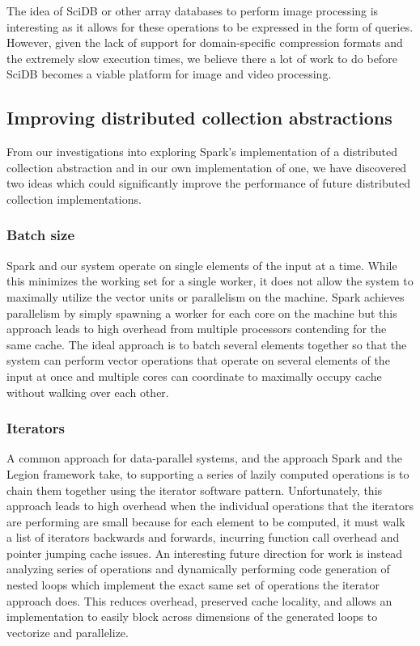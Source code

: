 \documentclass[tog]{acmsiggraph}
\begin{document}
The idea of SciDB or other array databases to perform image processing is
interesting as it allows for these operations to be expressed in the form of
queries. However, given the lack of support for domain-specific compression
formats and the extremely slow execution times, we believe there a lot of work
to do before SciDB becomes a viable platform for image and video processing.

\subsection{Improving distributed collection abstractions}
From our investigations into exploring Spark's implementation of a distributed
collection abstraction and in our own implementation of one, we have discovered
two ideas which could significantly improve the performance of future
distributed collection implementations.

\subsubsection{Batch size}
Spark and our system operate on single elements of the input at a time. While
this minimizes the working set for a single worker, it does not allow the
system to maximally utilize the vector units or parallelism on the
machine. Spark achieves parallelism by simply spawning a worker for each core
on the machine but this approach leads to high overhead from multiple
processors contending for the same cache. The ideal approach is to batch
several elements together so that the system can perform vector operations that
operate on several elements of the input at once and multiple cores can
coordinate to maximally occupy cache without walking over each other.

\subsubsection{Iterators}
A common approach for data-parallel systems, and the approach Spark and the
Legion framework take, to supporting a series of lazily computed operations
is to chain them together using the iterator software pattern. Unfortunately,
this approach leads to high overhead when the individual operations that the
iterators are performing are small because for each element to be computed, it
must walk a list of iterators backwards and forwards, incurring function call
overhead and pointer jumping cache issues. An interesting future direction for
work is instead analyzing series of operations and dynamically performing code
generation of nested loops which implement the exact same set of operations the
iterator approach does. This reduces overhead, preserved cache locality, and
allows an implementation to easily block across dimensions of the generated
loops to vectorize and parallelize.
\end{document}
